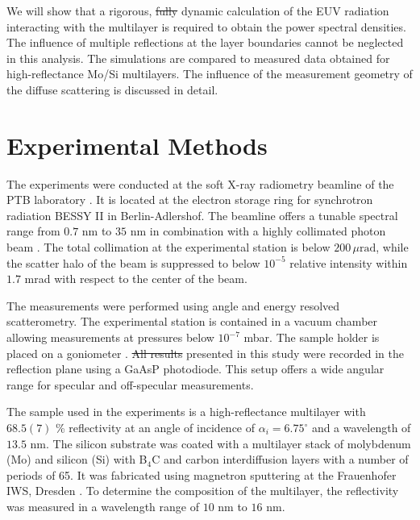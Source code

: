 \documentclass[twocolumn,osajnl,showpacs,superscriptaddress,11pt]{revtex4-1}
\providecommand{\DIFadd}[1]{{\protect\color{blue}\uwave{#1}}} %
\providecommand{\DIFdel}[1]{{\protect\color{red}\sout{#1}}}                      %
\providecommand{\DIFaddbegin}{} %
\providecommand{\DIFaddend}{} %
\providecommand{\DIFdelbegin}{} %
\providecommand{\DIFdelend}{} %
\begin{document}
We will show that a rigorous, \DIFdelbegin \DIFdel{fully }\DIFdelend dynamic calculation of the EUV radiation interacting with the multilayer is required to obtain the power spectral densities. The influence of multiple reflections at the layer boundaries cannot be neglected in this analysis. The simulations are compared to measured data obtained for high-reflectance Mo/Si multilayers. The influence of the measurement geometry of the diffuse scattering is discussed in detail.

\section{Experimental Methods} \label{sec:experimental} The experiments were conducted at the soft X-ray radiometry beamline of the PTB laboratory \cite{Beckhoff2009}. It is located at the electron storage ring for synchrotron radiation BESSY II in Berlin-Adlershof. The beamline offers a tunable spectral range from $0.7$ nm to $35$ nm in combination with a highly collimated photon beam \cite{ptbbeamline}. The total collimation at the experimental station is below $200\,\mu\text{rad}$, while the scatter halo of the beam is suppressed to below $10^{-5}$ relative intensity within $1.7$ mrad with respect to the center of the beam.

The measurements were performed using angle and energy resolved scatterometry. The experimental station is contained in a vacuum chamber allowing measurements at pressures below $10^{-7}$ mbar. The sample holder is placed on a goniometer \cite{PTBBigRef}. \DIFdelbegin \DIFdel{All results }\DIFdelend \DIFaddbegin \DIFadd{The scatter intensities }\DIFaddend presented in this study were recorded in the reflection plane using a GaAsP photodiode. This setup offers a wide angular range for specular and off-specular measurements. 

The sample used in the experiments is a high-reflectance multilayer with $68.5(7)$ \% reflectivity at an angle of incidence of $\alpha_i = 6.75^\circ$ and a wavelength of $13.5$ nm. The silicon substrate was coated with a multilayer stack of molybdenum (Mo) and silicon (Si) with B$_4$C and carbon interdiffusion layers with a number of periods of 65. It was fabricated using magnetron sputtering at the Frauenhofer IWS, Dresden \cite{braun2002mo}. To determine the composition of the multilayer, the reflectivity was measured in a wavelength range of $10$ nm to $16$ nm. 
\end{document}
